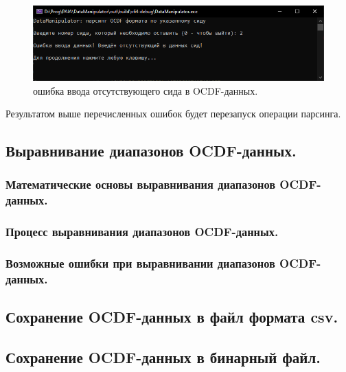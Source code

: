 {  \begin{figure}[H]
    \centering
    \includegraphics[width=\textwidth]{images/forDataManipulator/OCDFdataParsErrNotCID.png}
    \caption{ошибка ввода отсутствующего сида в OCDF-данных.} 
    \label{fig:OCDFdataParsErrnotcid}
  \end{figure}

  \par Результатом выше перечисленных ошибок будет перезапуск операции парсинга. 

}

\subsection{ \standartTitleFont
  Выравнивание диапазонов OCDF-данных.
}

\subsubsection{ \standartTitleFont
  Математические основы выравнивания диапазонов OCDF-данных.
}

\subsubsection{ \standartTitleFont
  Процесс выравнивания диапазонов OCDF-данных.
}

\subsubsection{ \standartTitleFont
  Возможные ошибки при выравнивании диапазонов OCDF-данных.
}

\subsection{ \standartTitleFont
  Сохранение OCDF-данных в файл формата csv.
}

\subsection{ \standartTitleFont
  Сохранение OCDF-данных в бинарный файл.
}